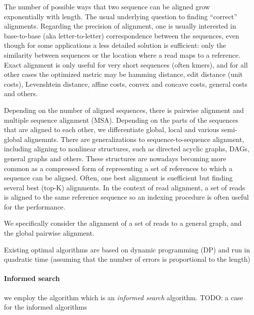 
The number of possible ways that two sequence can be aligned grow exponentially
with length. The usual underlying question to finding ``correct'' alignments.
Regarding the precision of alignment, one is usually interested in base-to-base
(aka letter-to-letter) correspondence between the sequences, even though for
some applications a less detailed solution is sufficient: only the similarity
between sequences or the location where a read maps to a reference. Exact
alignment is only useful for very short sequences (often kmers), and for all
other cases the optimized metric may be hamming distance, edit distance (unit
costs), Levenshtein distance, affine costs, convex and concave costs, general
costs and others. 

Depending on the number of aligned sequences, there is pairwise alignment and
multiple sequence alignment (MSA). Depending on the parts of the sequences that
are aligned to each other, we differentiate global, local and various
semi-global alignemnts. There are generalizations to sequence-to-sequence
alignment, including aligning to nonlinear structures, such as directed acyclic
graphs, DAGs, general graphs and others. These structures are nowadays becoming
more common as a compressed form of representing a set of references to which a
sequence can be aligned. Often, one best alignment is suefficient but finding
several best (top-K) alignments. In the context of read alignment, a set of
reads is aligned to the same reference sequence so an indexing procedure is
often useful for the performance.

We specifically consider the alignment of a set of reads to a general graph, and
the global pairwise alignment.

Existing optimal algorithms are based on dynamic programming (DP) and
run in quadratic time (assuming that the number of errors is proportional to the
length)

\paragraph{Informed search}
we employ the \A algorithm which is an \emph{informed search} algorithm.
TODO: a case for the informed algorithms

